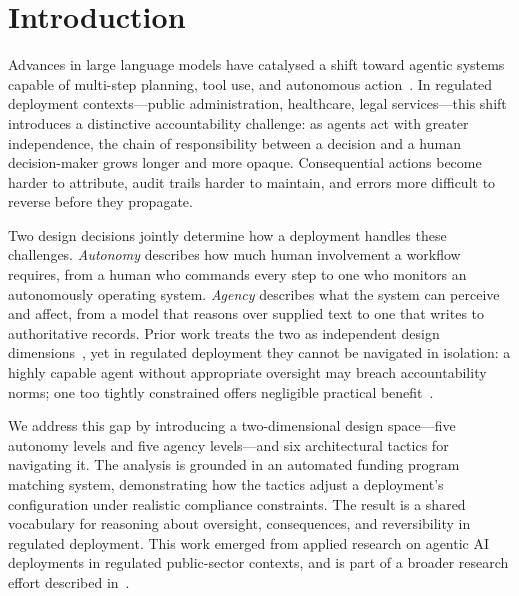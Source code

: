\section{Introduction}

Advances in large language models have catalysed a shift toward agentic systems capable of multi-step planning, tool use, and autonomous action~\cite{AbouAli2025}. In regulated deployment contexts---public administration, healthcare, legal services---this shift introduces a distinctive accountability challenge: as agents act with greater independence, the chain of responsibility between a decision and a human decision-maker grows longer and more opaque. Consequential actions become harder to attribute, audit trails harder to maintain, and errors more difficult to reverse before they propagate.

Two design decisions jointly determine how a deployment handles these challenges. \emph{Autonomy} describes how much human involvement a workflow requires, from a human who commands every step to one who monitors an autonomously operating system. \emph{Agency} describes what the system can perceive and affect, from a model that reasons over supplied text to one that writes to authoritative records. Prior work treats the two as independent design dimensions~\cite{Feng2025Levels}, yet in regulated deployment they cannot be navigated in isolation: a highly capable agent without appropriate oversight may breach accountability norms; one too tightly constrained offers negligible practical benefit~\cite{Mitchell2025}.

We address this gap by introducing a two-dimensional design space---five autonomy levels and five agency levels---and six architectural tactics for navigating it. The analysis is grounded in an automated funding program matching system, demonstrating how the tactics adjust a deployment's configuration under realistic compliance constraints. The result is a shared vocabulary for reasoning about oversight, consequences, and reversibility in regulated deployment. This work emerged from applied research on agentic AI deployments in regulated public-sector contexts, and is part of a broader research effort described in~\cite{safin2026arxiv}.
